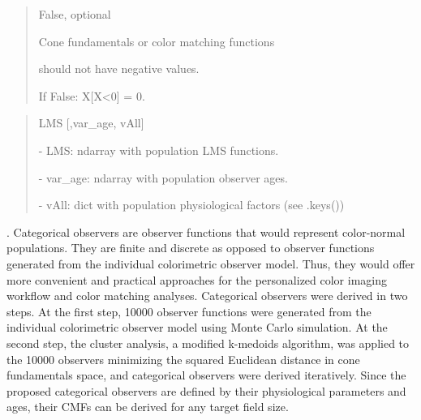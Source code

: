 \documentclass[letterpaper,10pt,english]{sphinxmanual}
\begin{document}
\begin{fulllineitems}
\begin{description}
\begin{quote}
\begin{description}
\item[{allow\_negative\_values}] \leavevmode
\begin{DUlineblock}{0em}
\item[] False, optional
\item[] Cone fundamentals or color matching functions 
\item[]
\begin{DUlineblock}{\DUlineblockindent}
\item[] should not have negative values.
\item[]
\begin{DUlineblock}{\DUlineblockindent}
\item[] If False: X{[}X\textless{}0{]} = 0.
\end{DUlineblock}
\end{DUlineblock}
\end{DUlineblock}

\end{description}\end{quote}

\item[{Returns:}] \leavevmode\begin{quote}\begin{description}
\item[{returns}] \leavevmode
\begin{DUlineblock}{0em}
\item[] LMS {[},var\_age, vAll{]} 
\item[]
\begin{DUlineblock}{\DUlineblockindent}
\item[] - LMS: ndarray with population LMS functions.
\item[] - var\_age: ndarray with population observer ages.
\item[] - vAll: dict with population physiological factors (see .keys()) 
\end{DUlineblock}
\end{DUlineblock}

\end{description}\end{quote}

\item[{Notes:}] . Categorical observers are observer functions that would represent 
color-normal populations. They are finite and discrete as opposed to 
observer functions generated from the individual colorimetric observer 
model. Thus, they would offer more convenient and practical approaches
for the personalized color imaging workflow and color matching analyses.
Categorical observers were derived in two steps. 
At the first step, 10000 observer functions were generated from the 
individual colorimetric observer model using Monte Carlo simulation. 
At the second step, the cluster analysis, a modified k-medoids 
algorithm, was applied to the 10000 observers minimizing the squared 
Euclidean distance in cone fundamentals space, and categorical 
observers were derived iteratively. Since the proposed categorical 
observers are defined by their physiological parameters and ages, their
CMFs can be derived for any target field size.


\end{description}
\end{fulllineitems}
\end{document}

